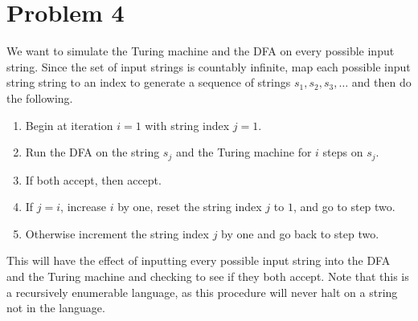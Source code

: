 \documentclass[12pt]{article}
\begin{document}
\section*{Problem 4}

We want to simulate the Turing machine and the DFA on every possible input string. Since the set of input strings is
countably infinite, map each possible input string string to an index to generate a sequence of strings \(s_1, s_2, s_3,\ldots\) and
then do the following.
\begin{enumerate}
        \item Begin at iteration \(i=1\) with string index \(j=1\).
        \item Run the DFA on the string \(s_j\) and the Turing machine for \(i\) steps on \(s_j\).
        \item If both accept, then accept.
        \item If \(j=i\), increase \(i\) by one, reset the string index \(j\) to \(1\), and go to step two.
        \item Otherwise increment the string index \(j\) by one and go back to step two.
\end{enumerate}
This will have the effect of inputting every possible input string into the DFA and the Turing machine and checking to see if they both accept.
Note that this is a recursively enumerable language, as this procedure will never halt on a string not in the language.
\end{document}
